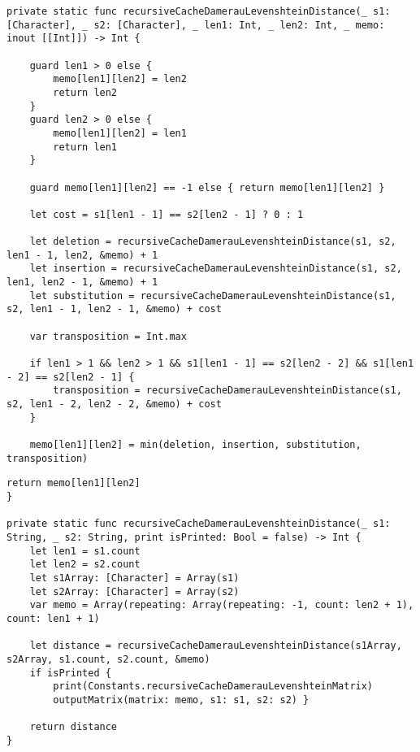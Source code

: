 \begin{lstlisting}[label=lst:recursiveCacheDamerauLevenshteinDistance,caption=Функция нахождения расстояния Дамерау~---~Левенштейна рекурсивно c кешированием]
private static func recursiveCacheDamerauLevenshteinDistance(_ s1: [Character], _ s2: [Character], _ len1: Int, _ len2: Int, _ memo: inout [[Int]]) -> Int {

	guard len1 > 0 else { 
		memo[len1][len2] = len2
		return len2 
	}
	guard len2 > 0 else { 
		memo[len1][len2] = len1
		return len1
	}

	guard memo[len1][len2] == -1 else { return memo[len1][len2] }

	let cost = s1[len1 - 1] == s2[len2 - 1] ? 0 : 1

	let deletion = recursiveCacheDamerauLevenshteinDistance(s1, s2, len1 - 1, len2, &memo) + 1
	let insertion = recursiveCacheDamerauLevenshteinDistance(s1, s2, len1, len2 - 1, &memo) + 1
	let substitution = recursiveCacheDamerauLevenshteinDistance(s1, s2, len1 - 1, len2 - 1, &memo) + cost

	var transposition = Int.max

	if len1 > 1 && len2 > 1 && s1[len1 - 1] == s2[len2 - 2] && s1[len1 - 2] == s2[len2 - 1] {
		transposition = recursiveCacheDamerauLevenshteinDistance(s1, s2, len1 - 2, len2 - 2, &memo) + cost
	}

	memo[len1][len2] = min(deletion, insertion, substitution, transposition)

\end{lstlisting}

\begin{lstlisting}[label=lst:recursiveCacheDamerauLevenshteinDistance2,caption=Продолжение листинга \ref{lst:recursiveCacheDamerauLevenshteinDistance}]
	return memo[len1][len2]
}

private static func recursiveCacheDamerauLevenshteinDistance(_ s1: String, _ s2: String, print isPrinted: Bool = false) -> Int {
	let len1 = s1.count
	let len2 = s2.count
	let s1Array: [Character] = Array(s1)
	let s2Array: [Character] = Array(s2)
	var memo = Array(repeating: Array(repeating: -1, count: len2 + 1), count: len1 + 1)
	
	let distance = recursiveCacheDamerauLevenshteinDistance(s1Array, s2Array, s1.count, s2.count, &memo)
	if isPrinted { 
		print(Constants.recursiveCacheDamerauLevenshteinMatrix)
		outputMatrix(matrix: memo, s1: s1, s2: s2) }

	return distance
}
\end{lstlisting}

